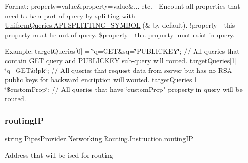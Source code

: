 Format\+: property=value\&property=value\&... etc. -\/ Encount all properties that need to be a part of query by splitting with \mbox{\hyperlink{class_uniform_queries_1_1_a_p_i_aa906970223172f9f2068baa410b621d8}{Uniform\+Queries.\+A\+P\+I.\+S\+P\+L\+I\+T\+T\+I\+N\+G\+\_\+\+S\+Y\+M\+B\+OL}} (\textquotesingle{}\&\textquotesingle{} by default). !property -\/ this property must be out of query. \$property -\/ this property must exist in query.

Example\+: target\+Queries\mbox{[}0\mbox{]} = \char`\"{}q=\+G\+E\+T\&sq=\char`\"{}P\+U\+B\+L\+I\+C\+K\+EY\char`\"{};   // All queries that contain G\+E\+T query and P\+U\+B\+L\+I\+C\+K\+E\+Y sub-\/query will routed.
target\+Queries\mbox{[}1\mbox{]} = \char`\"{}q=G\+ET\&!pk\char`\"{};             // All queries that request data from server but has no R\+S\+A public keys for backward encription will wouted.
target\+Queries\mbox{[}1\mbox{]} = \char`\"{}\$custom\+Prop\char`\"{};           // All queries that have \char`\"{}custom\+Prop" property in query will be routed. \mbox{\label{class_pipes_provider_1_1_networking_1_1_routing_1_1_instruction_adb75f80ff34fab644305856ccf23d07b}} 
\subsubsection{\texorpdfstring{routing\+IP}{routingIP}}
{\footnotesize\ttfamily string Pipes\+Provider.\+Networking.\+Routing.\+Instruction.\+routing\+IP}



Address that will be ised for routing 

\mbox{\label{class_pipes_provider_1_1_networking_1_1_routing_1_1_instruction_a61ce6ffa8bb9cc44efc57bc51be3550b}} 
